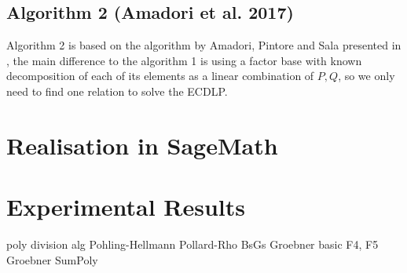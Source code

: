 \documentclass[thesis=M,english]{FITthesis}[2012/10/20]
\theoremstyle{remark}
\theoremstyle{definition}
\newtheorem{DF}{Definition}[section]
\begin{document}
\section{Algorithm 2 (Amadori et al. 2017)}
Algorithm 2 is based on the algorithm by Amadori, Pintore and Sala presented in \cite{amadori17}, the main difference to the algorithm 1 is using a factor base with known decomposition of each of its elements as a linear combination of $P,Q$, so we only need to find one relation to solve the ECDLP. 






\chapter{Realisation in SageMath}

\chapter{Experimental Results}
\label{expResults}
poly division alg
Pohling-Hellmann
Pollard-Rho
BsGs
Groebner basic
F4, F5 Groebner
SumPoly 
\end{document}
